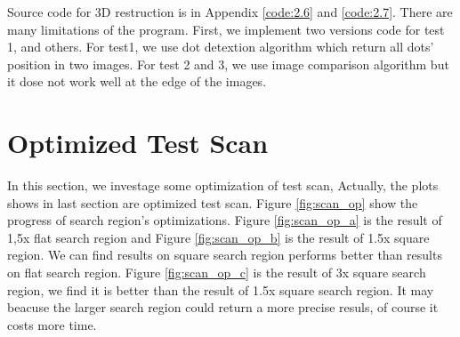 Source code for 3D restruction is in Appendix \ref{code:2.6} and \ref{code:2.7}. There are many limitations of the program. First, we implement two versions code for test 1, and others. For test1, we use dot detextion algorithm which return all dots' position in two images. For test 2 and 3, we use image comparison algorithm but it dose not work well at the edge of the images. 


\section{Optimized Test Scan}

In this section, we investage some optimization of test scan, Actually, the plots shows in last section are optimized test scan.  Figure \ref{fig:scan_op} show the progress of search region's optimizations. Figure \ref{fig:scan_op_a} is the result of 1,5x flat search region and Figure \ref{fig:scan_op_b} is the result of 1.5x square region. We can find results on square search region performs better than results on flat search region. Figure \ref{fig:scan_op_c} is the result of 3x square search region, we find it is better than the result of 1.5x square search region. It may beacuse the larger search region could return a more precise resuls, of course it costs more time.

